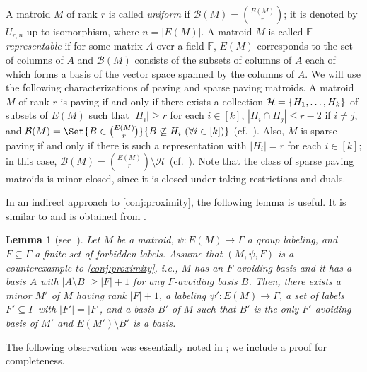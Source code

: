 \documentclass{article}
\DeclarePairedDelimiter{\set}{\{}{\}}
\newtheorem{lemma}[theorem]{Lemma}
\theoremstyle{definition}
\begin{document}
A matroid $M$ of rank $r$ is called \emph{uniform} if $\mathcal{B}(M)=\binom{E(M)}{r}$; it is denoted by $U_{r, n}$ up to isomorphism, where $n = |E(M)|$.
A matroid $M$ is called \emph{$\mathbb{F}$-representable} if for some matrix $A$ over a field $\mathbb{F}$, $E(M)$ corresponds to the set of columns of $A$ and $\mathcal{B}(M)$ consists of the subsets of columns of $A$ each of which forms a basis of the vector space spanned by the columns of $A$.
We will use the following characterizations of paving and sparse paving matroids.
A matroid $M$ of rank $r$ is paving if and only if there exists a collection $\mathcal{H} = \set{H_1, \dotsc, H_k}$ of subsets of $E(M)$ such that $|H_i| \ge r$ for each $i \in [k]$, $|H_i \cap H_j| \le r - 2$ if $i \ne j$, and $\mathcal{B}(M) = \Set{B \in \binom{E(M)}{r}}{B \not\subseteq H_i \ (\forall i \in [k])}$ (cf.~\cite[Theorem~5.3.5]{frank2011connections}).
Also, $M$ is sparse paving if and only if there is such a representation with $|H_i| = r$ for each $i \in [k]$; in this case, $\mathcal{B}(M) = \binom{E(M)}{r} \setminus \mathcal{H}$ (cf.~\cite[Lemma~2.1]{bonin2013basis}). Note that the class of sparse paving matroids is minor-closed, since it is closed under taking restrictions and duals.


In an indirect approach to \cref{conj:proximity}, the following lemma is useful. It is similar to \cite[Corollary 4.4]{liu2023congruency} and is obtained from \cite[Lemmas~5.35 and 5.36]{horsch2024problems_arxiv}. 

\begin{lemma}[see~\cite{horsch2024problems_arxiv}] \label{lem:reduction}
Let $M$ be a matroid, $\psi\colon E(M)\to \Gamma$ a group labeling, and $F\subseteq \Gamma$ a finite set of forbidden labels.
Assume that $(M, \psi, F)$ is a counterexample to \cref{conj:proximity}, i.e., $M$ has an $F$-avoiding basis and it has a basis $A$ with $|A\setminus B|\ge |F|+1$ for any $F$-avoiding basis $B$.
Then, there exists a minor $M'$ of $M$ having rank $|F|+1$, a labeling $\psi'\colon E(M)\to \Gamma$, a set of labels $F'\subseteq \Gamma$ with $|F'| = |F|$, and a basis $B'$ of $M$ such that $B'$ is the only $F'$-avoiding basis of $M'$ and $E(M')\setminus B'$ is a basis.
\end{lemma}

The following observation was essentially noted in \cite[Remark~5.16]{horsch2024problems_arxiv}; we include a proof for completeness.
\end{document}
